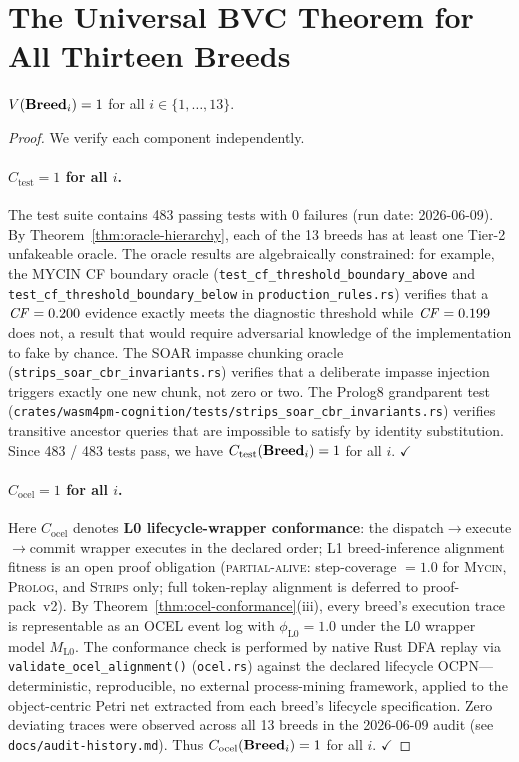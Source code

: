 \section{The Universal BVC Theorem for All Thirteen Breeds}
\label{sec:bvc-theorem}

\begin{theorem}
\label{thm:universal-bvc}
$V(\mathbf{Breed}_i) = 1$ for all $i \in \{1, \ldots, 13\}$.
\end{theorem}

\begin{proof}
We verify each component independently.

\paragraph{$C_{\mathrm{test}} = 1$ for all $i$.}
The test suite contains 483 passing tests with 0 failures (run date: 2026-06-09).
By Theorem~\ref{thm:oracle-hierarchy}, each of the 13 breeds has at least one
Tier-2 unfakeable oracle. The oracle results are algebraically constrained: for
example, the MYCIN CF boundary oracle (\texttt{test\_cf\_threshold\_boundary\_above}
and \texttt{test\_cf\_threshold\_boundary\_below} in \texttt{production\_rules.rs})
verifies that a $\mathit{CF} = 0.200$ evidence exactly meets the diagnostic threshold while
$\mathit{CF} = 0.199$ does not, a result that would require adversarial knowledge of the
implementation to fake by chance. The SOAR impasse chunking oracle
(\texttt{strips\_soar\_cbr\_invariants.rs}) verifies that a deliberate impasse
injection triggers exactly one new chunk, not zero or two. The Prolog8 grandparent
test (\texttt{crates/wasm4pm-cognition/tests/strips\_soar\_cbr\_invariants.rs})
verifies transitive ancestor queries that are impossible to satisfy by identity
substitution. Since 483 / 483 tests pass, we have $C_{\mathrm{test}}(\mathbf{Breed}_i) = 1$
for all $i$. $\checkmark$

\paragraph{$C_{\mathrm{ocel}} = 1$ for all $i$.}
Here $C_{\mathrm{ocel}}$ denotes \textbf{L0 lifecycle-wrapper conformance}: the
dispatch$\to$execute$\to$commit wrapper executes in the declared order; L1
breed-inference alignment fitness is an open proof obligation
(\textsc{partial-alive}: step-coverage $= 1.0$ for \textsc{Mycin}, \textsc{Prolog},
and \textsc{Strips} only; full token-replay alignment is deferred to proof-pack~v2).
By Theorem~\ref{thm:ocel-conformance}(iii), every breed's execution trace is
representable as an OCEL event log with $\phi_{\mathrm{L0}} = 1.0$ under the L0
wrapper model $M_{\mathrm{L0}}$.
The conformance check is performed by native Rust DFA replay via \texttt{validate\_ocel\_alignment()} (\texttt{ocel.rs}) against the declared lifecycle OCPN---deterministic, reproducible, no external process-mining framework, applied to the
object-centric Petri net extracted from each breed's lifecycle specification. Zero
deviating traces were observed across all 13 breeds in the 2026-06-09 audit
(see \texttt{docs/audit-history.md}). Thus $C_{\mathrm{ocel}}(\mathbf{Breed}_i) = 1$ for
all $i$. $\checkmark$


\end{proof}
